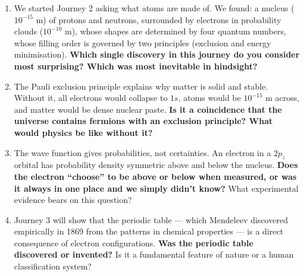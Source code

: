 \documentclass[12pt, a4paper]{book}
\begin{document}
\begin{reflectionbox}
\begin{enumerate}[label=\textbf{R\arabic*.}]
  \item We started Journey 2 asking what atoms are made of.
        We found: a nucleus ($10^{-15}$ m) of protons and neutrons,
        surrounded by electrons in probability clouds ($10^{-10}$ m),
        whose shapes are determined by four quantum numbers,
        whose filling order is governed by two principles
        (exclusion and energy minimisation).
        \textbf{Which single discovery in this journey do you
        consider most surprising? Which was most inevitable
        in hindsight?}

  \item The Pauli exclusion principle explains why matter
        is solid and stable.
        Without it, all electrons would collapse to $1s$,
        atoms would be $10^{-15}$ m across, and matter
        would be dense nuclear paste.
        \textbf{Is it a coincidence that the universe contains
        fermions with an exclusion principle? What would
        physics be like without it?}

  \item The wave function gives probabilities, not certainties.
        An electron in a $2p_z$ orbital has probability
        density symmetric above and below the nucleus.
        \textbf{Does the electron ``choose'' to be above or below
        when measured, or was it always in one place and
        we simply didn't know?}
        What experimental evidence bears on this question?

  \item Journey 3 will show that the periodic table ---
        which Mendeleev discovered empirically in 1869 from
        the patterns in chemical properties ---
        is a direct consequence of electron configurations.
        \textbf{Was the periodic table discovered or invented?}
        Is it a fundamental feature of nature or a human
        classification system?
\end{enumerate}
\end{reflectionbox}
\end{document}
